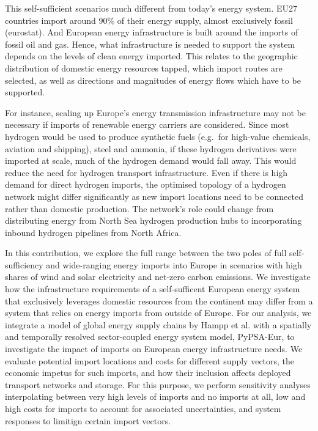 This self-sufficient scenarios much different from today's energy system. EU27
countries import around 90\% of their energy supply, almost exclusively fossil
(eurostat). And European energy infrastructure is built around the imports of
fossil oil and gas. Hence, what infrastructure is needed to support the system
depends on the levels of clean energy imported. This relates to the geographic
distribution of domestic energy resources tapped, which import routes are
selected, as well as directions and magnitudes of energy flows which have to be
supported.

For instance, scaling up Europe's energy transmission infrastructure may not be
necessary if imports of renewable energy carriers are considered. Since most
hydrogen would be used to produce synthetic fuels (e.g.~for high-value
chemicals, aviation and shipping), steel and ammonia,\cite{neumannBenefitsHydrogen2022a} if these
hydrogen derivatives were imported at scale, much of the hydrogen demand would
fall away. This would reduce the need for hydrogen transport infrastructure.
Even if there is high demand for direct hydrogen imports, the optimised topology
of a hydrogen network might differ significantly as new import locations need to
be connected rather than domestic production. The network's role could change
from distributing energy from North Sea hydrogen production hubs to
incorporating inbound hydrogen pipelines from North Africa.


In this contribution, we explore the full range between the two poles of full
self-sufficiency and wide-ranging energy imports into Europe in scenarios with
high shares of wind and solar electricity and net-zero carbon emissions. We
investigate how the infrastructure requirements of a self-sufficent European
energy system that exclusively leverages domestic resources from the continent
may differ from a system that relies on energy imports from outside of Europe.
For our analysis, we integrate a model of global energy supply chains by Hampp
et al.\cite{hamppImportOptions2023} with a spatially and temporally resolved
sector-coupled energy system model, PyPSA-Eur, to investigate the impact of
imports on European energy infrastructure needs. We evaluate potential import
locations and costs for different supply vectors, the economic impetus for such
imports, and how their inclusion affects deployed transport networks and
storage. For this purpose, we perform sensitivity analyses interpolating between
very high levels of imports and no imports at all, low and high costs for
imports to account for associated uncertainties, and system responses to
limitign certain import vectors.

